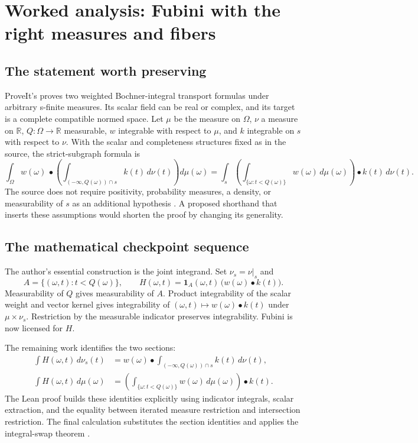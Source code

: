 \documentclass[11pt,a4paper]{article}
\newcommand{\code}[1]{\texttt{\detokenize{#1}}}
\newcommand{\R}{\mathbb R}\newcommand{\Q}{\mathbb Q}\newcommand{\Z}{\mathbb Z}\newcommand{\N}{\mathbb N}
\theoremstyle{definition}\newtheorem{definition}[theorem]{Definition}
\theoremstyle{remark}\newtheorem{remark}[theorem]{Remark}
\begin{document}
\section{Worked analysis: Fubini with the right measures and fibers}\label{sec:fubini}

\subsection{The statement worth preserving}
ProveIt's \code{SubgraphFubini.lean} proves two weighted Bochner-integral transport formulas under arbitrary s-finite measures. Its scalar field can be real or complex, and its target is a complete compatible normed space. Let $\mu$ be the measure on $\Omega$, $\nu$ a measure on $\R$, $Q:\Omega\to\R$ measurable, $w$ integrable with respect to $\mu$, and $k$ integrable on $s$ with respect to $\nu$. With the scalar and completeness structures fixed as in the source, the strict-subgraph formula is
\begin{equation}\label{eq:fubini}
 \int_\Omega w(\omega)\,\mathbin{\bullet}
       \left(\int_{(-\infty,Q(\omega))\cap s}k(t)\,d\nu(t)\right)d\mu(\omega)
 =\int_s\left(\int_{\{\omega:t<Q(\omega)\}}w(\omega)\,d\mu(\omega)\right)
       \mathbin{\bullet}k(t)\,d\nu(t).
\end{equation}
The source does not require positivity, probability measures, a density, or measurability of $s$ as an additional hypothesis \cite{subgraph}. A proposed shorthand that inserts these assumptions would shorten the proof by changing its generality.

\subsection{The mathematical checkpoint sequence}
The author's essential construction is the joint integrand. Set $\nu_s=\nu|_s$ and
\[
 A=\{(\omega,t):t<Q(\omega)\},\qquad
 H(\omega,t)=\mathbf1_A(\omega,t)\,
             \bigl(w(\omega)\mathbin{\bullet}k(t)\bigr).
\]
Measurability of $Q$ gives measurability of $A$. Product integrability of the scalar weight and vector kernel gives integrability of $(\omega,t)\mapsto w(\omega)\mathbin{\bullet}k(t)$ under $\mu\times\nu_s$. Restriction by the measurable indicator preserves integrability. Fubini is now licensed for $H$.

The remaining work identifies the two sections:
\begin{align*}
 \int H(\omega,t)\,d\nu_s(t)
   &=w(\omega)\mathbin{\bullet}
      \int_{(-\infty,Q(\omega))\cap s} k(t)\,d\nu(t),\\
 \int H(\omega,t)\,d\mu(\omega)
   &=\left(\int_{\{\omega:t<Q(\omega)\}}w(\omega)\,d\mu(\omega)\right)
      \mathbin{\bullet}k(t).
\end{align*}
The Lean proof builds these identities explicitly using indicator integrals, scalar extraction, and the equality between iterated measure restriction and intersection restriction. The final calculation substitutes the section identities and applies the integral-swap theorem \cite{subgraph}.
\end{document}
